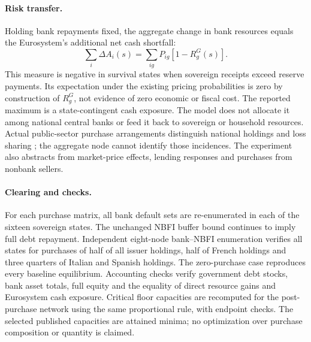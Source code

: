 \paragraph{Risk transfer.}
Holding bank repayments fixed, the aggregate change in bank resources equals the Eurosystem's additional net cash shortfall:
\[
 \sum_i\Delta A_i(s)=\sum_{ig}P_{ig}[1-R_g^G(s)].
\]
This measure is negative in survival states when sovereign receipts exceed reserve payments. Its expectation under the existing pricing probabilities is zero by construction of $R_g^G$, not evidence of zero economic or fiscal cost. The reported maximum is a state-contingent cash exposure. The model does not allocate it among national central banks or feed it back to sovereign or household resources. Actual public-sector purchase arrangements distinguish national holdings and loss sharing \citep{ECBPSPPFAQ}; the aggregate node cannot identify those incidences. The experiment also abstracts from market-price effects, lending responses and purchases from nonbank sellers.

\paragraph{Clearing and checks.}
For each purchase matrix, all bank default sets are re-enumerated in each of the sixteen sovereign states. The unchanged NBFI buffer bound continues to imply full debt repayment. Independent eight-node bank--NBFI enumeration verifies all states for purchases of half of all issuer holdings, half of French holdings and three quarters of Italian and Spanish holdings. The zero-purchase case reproduces every baseline equilibrium. Accounting checks verify government debt stocks, bank asset totals, full equity and the equality of direct resource gains and Eurosystem cash exposure. Critical floor capacities are recomputed for the post-purchase network using the same proportional rule, with endpoint checks. The selected published capacities are attained minima; no optimization over purchase composition or quantity is claimed.

\FloatBarrier
